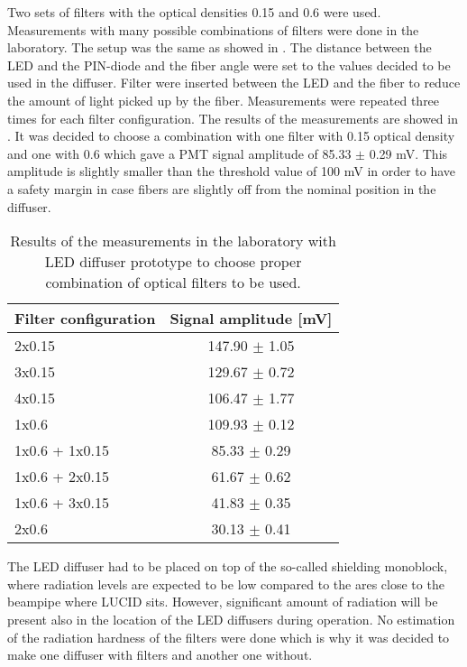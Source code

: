 Two sets of filters with the optical densities 0.15 and 0.6 were used. 
Measurements with many possible combinations of filters were done in the laboratory.
The setup was the same as showed in . The distance between the LED and the PIN-diode 
and the fiber angle were set to the values 
decided to be used in the diffuser. 
Filter were inserted between the LED and the fiber to reduce the amount of light picked up by the fiber.
Measurements were repeated three times for each filter configuration. The results of the measurements are showed in .
It was decided to choose a combination with one filter with 0.15 optical density and one with 0.6 which gave a PMT signal amplitude of 85.33 $\pm$ 0.29 mV.
This amplitude is slightly smaller than the threshold value of 100 mV in order to have a safety margin in case fibers 
are slightly off from the nominal position in the diffuser.

\begin{table}[bp]
  \begin{tabular}{l|c}
    Filter configuration & Signal amplitude [mV]\\
    \hline
    2x0.15       	&	147.90	$\pm$	1.05	\\
    3x0.15       	&	129.67	$\pm$	0.72	\\
    4x0.15       	&	106.47	$\pm$	1.77	\\
    1x0.6          	&	109.93	$\pm$	0.12	\\
    1x0.6 + 1x0.15 	&	85.33	$\pm$	0.29	\\
    1x0.6 + 2x0.15 	&	61.67	$\pm$	0.62	\\
    1x0.6 + 3x0.15 	&	41.83	$\pm$	0.35	\\
    2x0.6	        &	30.13	$\pm$	0.41	\\
  \end{tabular}
  \caption{Results of the measurements in the laboratory with LED diffuser prototype to choose proper combination of optical filters to be used.}
  \label{tab:FilterChoice}
\end{table}

The LED diffuser had to be placed on top of the so-called shielding monoblock, where radiation levels are expected to be low compared to the ares 
close to the beampipe where LUCID sits.
However, significant amount of radiation will be present also in the location of the LED diffusers during operation.
No estimation of the radiation hardness of the filters were done which is why it was decided to make one diffuser with filters and another one without.

